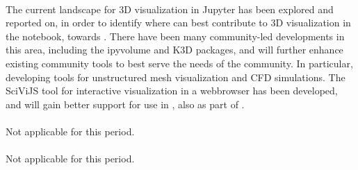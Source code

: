\documentclass{deliverablereport}
\begin{document}
\paragraph{}

The current landscape for 3D visualization in Jupyter has been explored and reported on,
in order to identify where \ODK can best contribute to 3D visualization in the notebook, towards . There have been many community-led developments in this area, including the ipyvolume and K3D packages, and \ODK will further enhance existing community tools to best serve the needs of the community. In particular, developing tools for unstructured mesh visualization and CFD simulations. The SciViJS tool for interactive visualization in a webbrowser has been developed, and will gain better support for use in \Jupyter, also as part of .

\paragraph{} %

Not applicable for this period.

\paragraph{} %

Not applicable for this period.

\paragraph{} %
\end{document}
